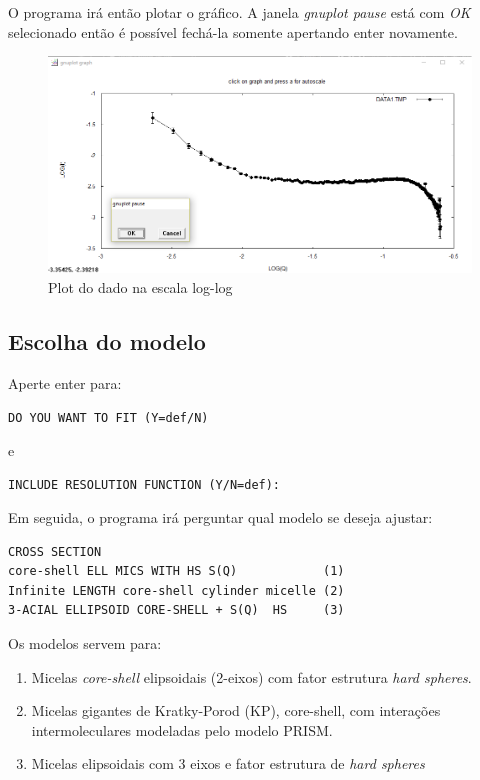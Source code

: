 \begin{apendicesenv}
O programa irá então plotar o gráfico. A janela \emph{gnuplot pause} está com \emph{OK} selecionado então é possível fechá-la somente apertando enter novamente.

\begin{figure}[h]
	\includegraphics[scale=0.5]{./imagens/saxs/supersaxs_gnuplot}
	\centering
	\caption{Plot do dado na escala log-log}
	\centering
\end{figure}

\subsection{Escolha do modelo}

Aperte enter para:

\texttt{DO YOU WANT TO FIT (Y=def/N)}

e

\texttt{INCLUDE RESOLUTION FUNCTION (Y/N=def):}

Em seguida, o programa irá perguntar qual modelo se deseja ajustar:

\begin{verbatim}
CROSS SECTION
core-shell ELL MICS WITH HS S(Q)            (1)
Infinite LENGTH core-shell cylinder micelle (2)
3-ACIAL ELLIPSOID CORE-SHELL + S(Q)  HS     (3)
\end{verbatim}

Os modelos servem para:

\begin{enumerate}
	\item Micelas \emph{core-shell} elipsoidais (2-eixos) com fator estrutura \emph{hard spheres}.
	\item Micelas gigantes de Kratky-Porod (KP), core-shell, com interações intermoleculares modeladas pelo modelo PRISM.
	\item Micelas elipsoidais com 3 eixos e fator estrutura de \emph{hard spheres}
\end{enumerate}


\end{apendicesenv}
